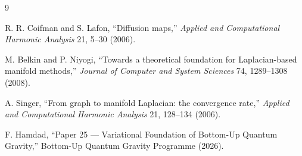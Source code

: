 \documentclass[11pt,a4paper]{article}
\begin{document}
\begin{thebibliography}{9}

R. R. Coifman and S. Lafon,
``Diffusion maps,''
\emph{Applied and Computational Harmonic Analysis} 21, 5--30 (2006).

M. Belkin and P. Niyogi,
``Towards a theoretical foundation for Laplacian-based manifold methods,''
\emph{Journal of Computer and System Sciences} 74, 1289--1308 (2008).

A. Singer,
``From graph to manifold Laplacian: the convergence rate,''
\emph{Applied and Computational Harmonic Analysis} 21, 128--134 (2006).

F. Hamdad,
``Paper 25 --- Variational Foundation of Bottom-Up Quantum Gravity,''
Bottom-Up Quantum Gravity Programme (2026).

\end{thebibliography}
\end{document}
